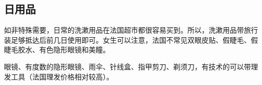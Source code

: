 \subsection{日用品}

如非特殊需要，日常的洗漱用品在法国超市都很容易买到。所以，洗漱用品带旅行装足够抵达后前几日使用即可。女生可以注意，法国不常见双眼皮贴、假睫毛、假睫毛胶水、有色隐形眼镜和美瞳。

眼镜、有度数的隐形眼镜、雨伞、针线盒、指甲剪刀、剃须刀，有技术的可以带理发工具（法国理发价格相对较高）。
